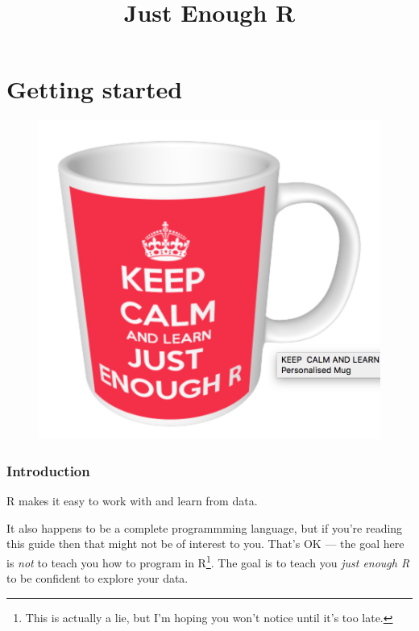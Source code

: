 \documentclass[]{article}
\title{Just Enough R}
\author{}
\date{}
\let\rmarkdownfootnote\footnote%
\def\footnote{\protect\rmarkdownfootnote}
\theoremstyle{definition}
\theoremstyle{definition}
\theoremstyle{definition}
\theoremstyle{remark}
\begin{document}
\maketitle

{
\setcounter{tocdepth}{2}
\tableofcontents
}
\section*{}\label{section}

\part{Getting started}\label{part-getting-started}

\begin{figure}
\centering
\includegraphics{media/keepcalm.png}
\caption{}
\end{figure}

\section*{Introduction}\label{introduction}

R makes it easy to work with and learn from data.

It also happens to be a complete programmming language, but if you're
reading this guide then that might not be of interest to you. That's OK
--- the goal here is \emph{not} to teach you how to program in
R\footnote{This is actually a lie, but I'm hoping you won't notice until
  it's too late.}. The goal is to teach you \emph{just enough R} to be
confident to explore your data.
\end{document}
